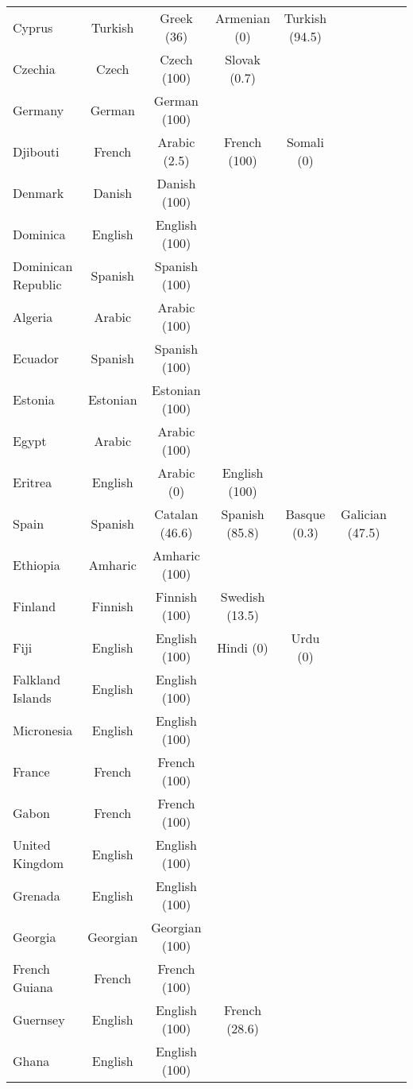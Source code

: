 \begin{longtable}{lc | c | c | c | c | c}
 Cyprus & Turkish & Greek (36) & Armenian (0) & Turkish (94.5) &   &   \\ 
 Czechia & Czech & Czech (100) & Slovak (0.7) &   &   &   \\ 
 Germany & German & German (100) &   &   &   &   \\ 
 Djibouti & French & Arabic (2.5) & French (100) & Somali (0) &   &   \\ 
 Denmark & Danish & Danish (100) &   &   &   &   \\ 
 Dominica & English & English (100) &   &   &   &   \\ 
 Dominican Republic & Spanish & Spanish (100) &   &   &   &   \\ 
 Algeria & Arabic & Arabic (100) &   &   &   &   \\ 
 Ecuador & Spanish & Spanish (100) &   &   &   &   \\ 
 Estonia & Estonian & Estonian (100) &   &   &   &   \\ 
 Egypt & Arabic & Arabic (100) &   &   &   &   \\ 
 Eritrea & English & Arabic (0) & English (100) &   &   &   \\ 
 Spain & Spanish & Catalan (46.6) & Spanish (85.8) & Basque (0.3) & Galician (47.5) &   \\ 
 Ethiopia & Amharic & Amharic (100) &   &   &   &   \\ 
 Finland & Finnish & Finnish (100) & Swedish (13.5) &   &   &   \\ 
 Fiji & English & English (100) & Hindi (0) & Urdu (0) &   &   \\ 
 Falkland Islands & English & English (100) &   &   &   &   \\ 
 Micronesia & English & English (100) &   &   &   &   \\ 
 France & French & French (100) &   &   &   &   \\ 
 Gabon & French & French (100) &   &   &   &   \\ 
 United Kingdom & English & English (100) &   &   &   &   \\ 
 Grenada & English & English (100) &   &   &   &   \\ 
 Georgia & Georgian & Georgian (100) &   &   &   &   \\ 
 French Guiana & French & French (100) &   &   &   &   \\ 
 Guernsey & English & English (100) & French (28.6) &   &   &   \\ 
 Ghana & English & English (100) &   &   &   &   \\ 

\end{longtable}

